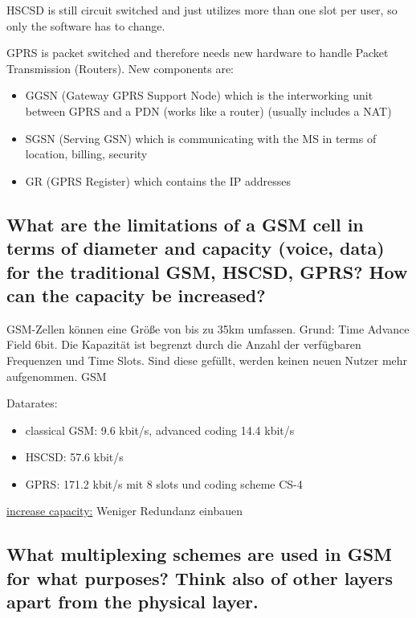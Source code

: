 HSCSD is still circuit switched and just utilizes more than one slot per user, so only the software has to change. 

GPRS is packet switched and therefore needs new hardware to handle Packet Transmission (Routers).
New components are:
\begin{itemize}

\item GGSN (Gateway GPRS Support Node) which is the interworking unit between GPRS and a PDN (works like a router) (usually includes a NAT)

\item SGSN (Serving GSN) which is communicating with the MS in terms of location, billing, security

\item GR (GPRS Register) which contains the IP addresses
\end{itemize}

\subsection{What are the limitations of a GSM cell in terms of diameter and capacity (voice, data) for the traditional GSM, HSCSD, GPRS? How can the capacity be increased?}

GSM-Zellen können eine Größe von bis zu 35km umfassen. Grund: Time Advance Field 6bit. Die Kapazität ist begrenzt durch die Anzahl der verfügbaren Frequenzen und Time Slots. Sind diese gefüllt, werden keinen neuen Nutzer mehr aufgenommen. GSM

Datarates:

\begin{itemize}
\item classical GSM: 9.6 kbit/s, advanced coding 14.4 kbit/s

\item HSCSD: 57.6 kbit/s 

\item GPRS: 171.2 kbit/s mit 8 slots und coding scheme CS-4
\end{itemize}

\underline{increase capacity:} Weniger Redundanz einbauen

\subsection{What multiplexing schemes are used in GSM for what purposes? Think also of other layers apart from the physical layer.}


